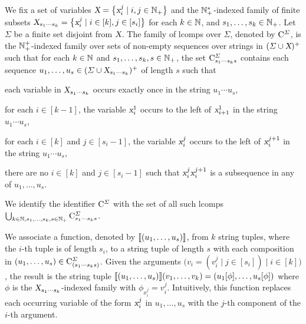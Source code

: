 \documentclass[../document.tex]{subfiles}
\begin{document}
    \begin{definition}[Compositions]
        We fix a set of variables \(\textsl{X} = \big\{ \textsl{x}_i^j \mid i, j \in \mathbb{N}_+ \big\}\) and the \(\mathbb{N}_+^*\)-indexed family of finite subsets \(\textsl{X}_{s_1\cdots s_k} = \big\{ \textsl{x}_i^j \mid i \in [k], j \in [s_i] \big\}\) for each \(k \in \mathbb{N}\), and \(s_1, \ldots, s_k \in \mathbb{N}_+\).
        Let \(\varSigma\) be a finite set disjoint from \(\textsl{X}\).
        The family of \glspl{lcomp} over \(\varSigma\), denoted by \(\mathrm{C}^\varSigma\), is the \(\mathbb{N}_+^+\)-indexed family over sets of non-empty sequences over strings in \((\varSigma \cup \textsl{X})^+\) such that for each \(k \in \mathbb{N}\) and \(s_1, \ldots, s_k, s \in \mathbb{N}_+\), the set \(\mathrm{C}^\varSigma_{s_1 \cdots s_k s}\) contains each sequence \(u_1, \ldots, u_s \in (\varSigma \cup \textsl{X}_{s_1 \cdots s_k})^+\) of length \(s\) such that
        \begin{compactenum}[(i)]
            \item each variable in \(\textsl{X}_{s_1 \cdots s_k}\) occurs exactly once in the string \(u_1 \cdots u_s\),
            \item for each \(i \in [k-1]\), the variable \(\textsl{x}_i^1\) occurs to the left of \(\textsl{x}_{i+1}^1\) in the string \(u_1 \cdots u_s\),
            \item for each \(i \in [k]\) and \(j \in [s_i-1]\), the variable \(\textsl{x}_i^j\) occurs to the left of \(\textsl{x}_i^{j+1}\) in the string \(u_1 \cdots u_s\),
            \item there are no \(i \in [k]\) and \(j \in [s_i-1]\) such that \(\textsl{x}^j_i\textsl{x}^{j+1}_i\) is a subsequence in any of \(u_1, \ldots, u_s\).
        \end{compactenum}
        We identify the identifier \(\mathrm{C}^\varSigma\) with the set of all such \glspl*{lcomp} \(\bigcup_{k \in \mathbb{N}, s_1, \ldots, s_k, s \in \mathbb{N}_+} \mathrm{C}^{\varSigma}_{s_1 \cdots s_k s}\).

        We associate a function, denoted by \(\llbracket(u_1, \ldots, u_s)\rrbracket\), from \(k\) string tuples, where the \(i\)-th tuple is of length \(s_i\), to a string tuple of length \(s\) with each composition in \((u_1, \ldots, u_s) \in \mathrm{C}^\varSigma_{(s_1\cdots s_k s)}\).
        Given the arguments \(\big(v_i = (v_i^j \mid j \in [s_i]) \mid i \in [k]\big)\), the result is the string tuple \(
            \llbracket(u_1, \ldots, u_s)\rrbracket(v_1, \ldots, v_k) = (u_1[\phi], \ldots, u_s[\phi])
        \) where \(\phi\) is the \(\textsl{X}_{s_1 \cdots s_k}\)-indexed family with \(\phi_{x_i^j} = v_i^j\).
        Intuitively, this function replaces each occurring variable of the form \(\textsl{x}_i^j\) in \(u_1, \ldots, u_s\) with the \(j\)-th component of the \(i\)-th argument.
    \end{definition}
\end{document}
